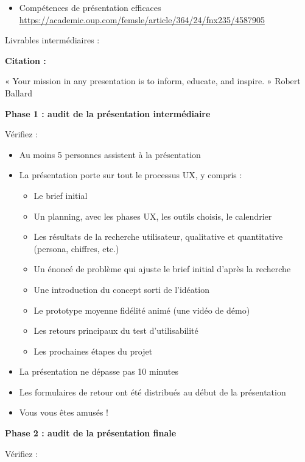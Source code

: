 \begin{itemize}
\item Compétences de présentation efficaces \url{https://academic.oup.com/femsle/article/364/24/fnx235/4587905}
\end{itemize}

Livrables intermédiaires :

\textbf{Citation :}

« Your mission in any presentation is to inform, educate, and inspire. » Robert Ballard

\medskip

\textbf{Phase 1 : audit de la présentation intermédiaire}

Vérifiez :

\begin{itemize}
\item Au moins 5 personnes assistent à la présentation
\item La présentation porte sur tout le processus UX, y compris :
\begin{itemize}
\item Le brief initial
\item Un planning, avec les phases UX, les outils choisis, le calendrier
\item Les résultats de la recherche utilisateur, qualitative et quantitative (persona, chiffres, etc.)
\item Un énoncé de problème qui ajuste le brief initial d'après la recherche
\item Une introduction du concept sorti de l'idéation
\item Le prototype moyenne fidélité animé (une vidéo de démo)
\item Les retours principaux du test d'utilisabilité
\item Les prochaines étapes du projet
\end{itemize}
\item La présentation ne dépasse pas 10 minutes
\item Les formulaires de retour ont été distribués au début de la présentation
\item Vous vous êtes amusés !
\end{itemize}

\medskip

\textbf{Phase 2 : audit de la présentation finale}

Vérifiez :

